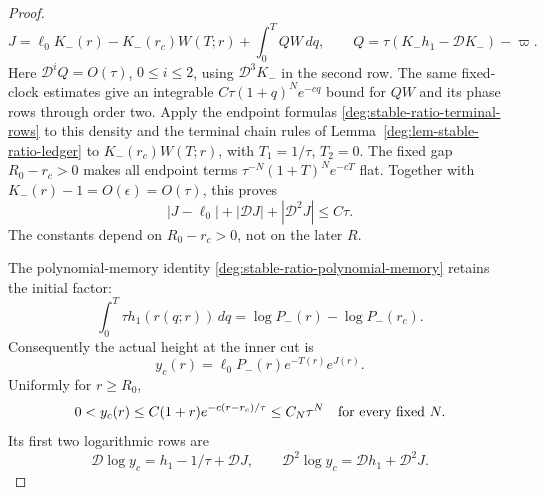 \begin{proof}
\begin{equation}\label{deg:source-growing-exact-action-integral}
 J=\ell_0K_-(r)-K_-(r_c)W(T;r)+\int_0^T QW\,dq,
 \qquad Q=\tau(K_-h_1-\mathcal DK_-)-\varpi .
\end{equation}
Here \(\mathcal D^iQ=O(\tau)\), \(0\le i\le2\), using
\(\mathcal D^3K_-\) in the second row. The same fixed-clock
estimates give an integrable \(C\tau(1+q)^Ne^{-cq}\) bound for
\(QW\) and its phase rows through order two. Apply the endpoint formulas
\eqref{deg:stable-ratio-terminal-rows} to this density and the
terminal chain rules of Lemma~\ref{deg:lem-stable-ratio-ledger}
to \(K_-(r_c)W(T;r)\), with
\(T_1=1/\tau\), \(T_2=0\). The fixed gap \(R_0-r_c>0\)
makes all endpoint terms \(\tau^{-N}(1+T)^Ne^{-cT}\) flat.
Together with \(K_-(r)-1=O(\epsilon)=O(\tau)\), this proves
\begin{equation}
 |J-\ell_0|+|\mathcal DJ|+|\mathcal D^2J|\le C\tau .
 \label{deg:source-growing-nonlinear-action-rows}
\end{equation}
The constants depend on \(R_0-r_c>0\), not on the later \(R\).

The polynomial-memory identity
\eqref{deg:stable-ratio-polynomial-memory} retains the initial factor:
\begin{equation}
 \int_0^T\tau h_1(r(q;r))\,dq
             =\log P_-(r)-\log P_-(r_c).
 \label{deg:source-growing-polynomial-memory}
\end{equation}
Consequently the actual height at the inner cut is
\begin{equation}
 y_c(r)=\ell_0P_-(r)e^{-T(r)}e^{J(r)} .
 \label{deg:source-growing-inner-cut-height}
\end{equation}
Uniformly for \(r\ge R_0\),
\begin{equation}
 0<y_c(r)\le C(1+r)e^{-c(r-r_c)/\tau}
           \le C_N\tau^N\quad\hbox{for every fixed }N .
 \label{deg:source-growing-inner-cut-flatness}
\end{equation}
Its first two logarithmic rows are
\begin{equation}
 \mathcal D\log y_c=h_1-1/\tau+\mathcal DJ,\qquad
 \mathcal D^2\log y_c=\mathcal Dh_1+\mathcal D^2J .
 \label{deg:source-growing-inner-cut-log-rows}
\end{equation}


\end{proof}
